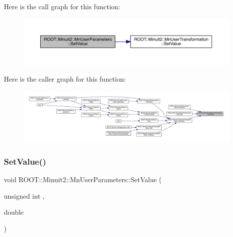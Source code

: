 Here is the call graph for this function\+:
\nopagebreak
\begin{figure}[H]
\begin{center}
\leavevmode
\includegraphics[width=350pt]{d6/d10/classROOT_1_1Minuit2_1_1MnUserParameters_a6a2523d00c1b000fbc1c95da7a4a926a_cgraph}
\end{center}
\end{figure}
Here is the caller graph for this function\+:
\nopagebreak
\begin{figure}[H]
\begin{center}
\leavevmode
\includegraphics[width=350pt]{d6/d10/classROOT_1_1Minuit2_1_1MnUserParameters_a6a2523d00c1b000fbc1c95da7a4a926a_icgraph}
\end{center}
\end{figure}
\mbox{\label{classROOT_1_1Minuit2_1_1MnUserParameters_a6a2523d00c1b000fbc1c95da7a4a926a}} 
\subsubsection{\texorpdfstring{SetValue()}{SetValue()}\hspace{0.1cm}{\footnotesize\ttfamily [2/6]}}
{\footnotesize\ttfamily void R\+O\+O\+T\+::\+Minuit2\+::\+Mn\+User\+Parameters\+::\+Set\+Value (\begin{DoxyParamCaption}\item[{unsigned int}]{,  }\item[{double}]{ }\end{DoxyParamCaption})}

\mbox{\label{classROOT_1_1Minuit2_1_1MnUserParameters_a6a2523d00c1b000fbc1c95da7a4a926a}} 
